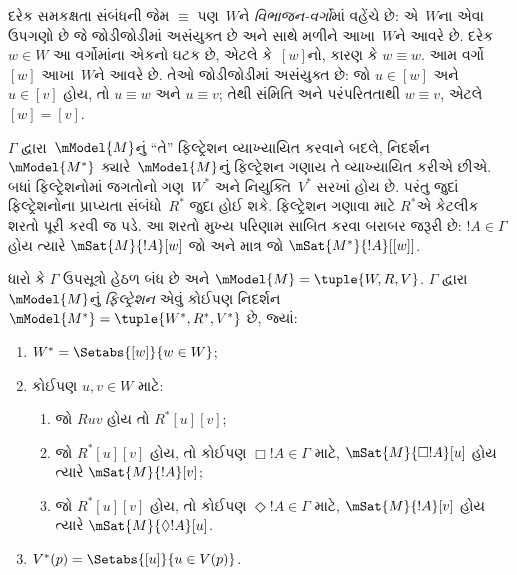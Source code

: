 દરેક સમકક્ષતા સંબંધની જેમ $\equiv$ પણ~$W$ને \emph{વિભાજન-વર્ગો}માં
વહેંચે છે: એ~$W$ના એવા ઉપગણો છે જે જોડીજોડીમાં અસંયુક્ત છે અને
સાથે મળીને આખા~$W$ને આવરે છે. દરેક $w \in W$ આ વર્ગોમાંના
એકનો ઘટક છે, એટલે કે~$[w]$નો, કારણ કે $w \equiv w$.
આમ વર્ગો $[w]$ આખા~$W$ને આવરે છે. તેઓ જોડીજોડીમાં અસંયુક્ત છે:
જો $u \in [w]$ અને $u \in [v]$ હોય, તો $u \equiv w$ અને
$u \equiv v$; તેથી સંમિતિ અને પરંપરિતતાથી $w \equiv v$,
એટલે $[w] = [v]$.
\endgroup

\begingroup
\makeatletter{}\makeatother


\label{guunit:OLP-0453}


$\Gamma$ દ્વારા~$\mModel{M}$નું ``તે'' ફિલ્ટ્રેશન વ્યાખ્યાયિત
કરવાને બદલે, નિદર્શન~$\mModel{M^*}$ ક્યારે~$\mModel{M}$નું
ફિલ્ટ્રેશન ગણાય તે વ્યાખ્યાયિત કરીએ છીએ. બધાં ફિલ્ટ્રેશનોમાં
જગતોનો ગણ~$W^*$ અને નિયુક્તિ~$V^*$ સરખાં હોય છે. પરંતુ જુદાં
ફિલ્ટ્રેશનોના પ્રાપ્યતા સંબંધો~$R^*$ જુદા હોઈ શકે. ફિલ્ટ્રેશન
ગણાવા માટે $R^*$એ કેટલીક શરતો પૂરી કરવી જ પડે. આ શરતો મુખ્ય
પરિણામ સાબિત કરવા બરાબર જરૂરી છે: $!A \in \Gamma$ હોય ત્યારે
$\mSat{M}{!A}[w]$ જો અને માત્ર જો
$\mSat{M^*}{!A}[{[w]}]$.

\begin{defn}
  ધારો કે $\Gamma$ ઉપસૂત્રો હેઠળ બંધ છે અને
  $\mModel{M} = \tuple{W, R, V}$. $\Gamma$ દ્વારા
  $\mModel{M}$નું \emph{ફિલ્ટ્રેશન} એવું કોઈપણ નિદર્શન
  $\mModel{M^*} = \tuple{W^*,R^*,V^*}$ છે, જ્યાં:
  \begin{enumerate}
  \item $W^* = \Setabs{[w]}{w \in W}$;
  \item {}%
    કોઈપણ $u,v \in W$ માટે:
    \begin{enumerate}
    \item {}%
      જો $Ruv$ હોય તો $R^*[u][v]$;
    \item {}%
      જો $R^*[u][v]$ હોય, તો કોઈપણ $\Box !A \in \Gamma$ માટે,
      $\mSat{M}{\Box!A}[u]$ હોય ત્યારે $\mSat{M}{!A}[v]$;
    \item {}%
      જો $R^*[u][v]$ હોય, તો કોઈપણ $\Diamond !A \in \Gamma$
      માટે, $\mSat{M}{!A}[v]$ હોય ત્યારે
      $\mSat{M}{\Diamond!A}[u]$.
    \end{enumerate}
  \item $V^*(p) = \Setabs{[u]}{u \in V(p)}$.
  \end{enumerate}
\end{defn}

